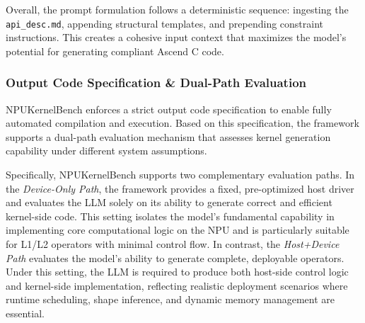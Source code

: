 Overall, the prompt formulation follows a deterministic sequence: ingesting the \texttt{api\_desc.md}, appending structural templates, and prepending constraint instructions. This creates a cohesive input context that maximizes the model's potential for generating compliant Ascend C code.

\subsubsection{Output Code Specification \& Dual-Path Evaluation}

NPUKernelBench enforces a strict output code specification to enable fully automated compilation and execution. Based on this specification, the framework supports a dual-path evaluation mechanism that assesses kernel generation capability under different system assumptions.

Specifically, NPUKernelBench supports two complementary evaluation paths. In the \emph{Device-Only Path}, the framework provides a fixed, pre-optimized host driver and evaluates the LLM solely on its ability to generate correct and efficient kernel-side code. This setting isolates the model’s fundamental capability in implementing core computational logic on the NPU and is particularly suitable for L1/L2 operators with minimal control flow. In contrast, the \emph{Host+Device Path} evaluates the model’s ability to generate complete, deployable operators. Under this setting, the LLM is required to produce both host-side control logic and kernel-side implementation, reflecting realistic deployment scenarios where runtime scheduling, shape inference, and dynamic memory management are essential.

